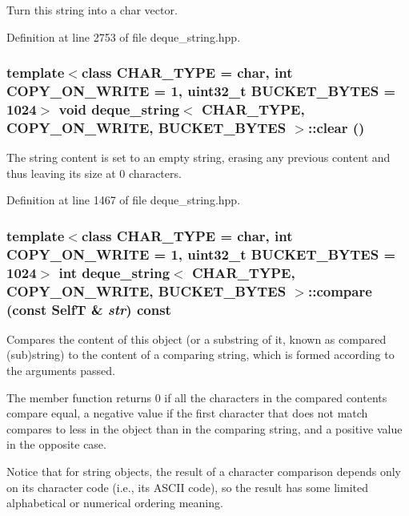 Turn this string into a char vector. 

Definition at line 2753 of file deque\_\-string.hpp.\hypertarget{classdeque__string_4ee86cce5b0bdf35309bcdf0e1cee4e5}{
\subsubsection[{clear}]{\setlength{\rightskip}{0pt plus 5cm}template$<$class CHAR\_\-TYPE  = char, int COPY\_\-ON\_\-WRITE = 1, uint32\_\-t BUCKET\_\-BYTES = 1024$>$ void {\bf deque\_\-string}$<$ CHAR\_\-TYPE, COPY\_\-ON\_\-WRITE, BUCKET\_\-BYTES $>$::clear ()}}
\label{classdeque__string_4ee86cce5b0bdf35309bcdf0e1cee4e5}


The string content is set to an empty string, erasing any previous content and thus leaving its size at 0 characters. 

Definition at line 1467 of file deque\_\-string.hpp.\hypertarget{classdeque__string_703af7d90146d6f0589d5a778e488ebf}{
\subsubsection[{compare}]{\setlength{\rightskip}{0pt plus 5cm}template$<$class CHAR\_\-TYPE  = char, int COPY\_\-ON\_\-WRITE = 1, uint32\_\-t BUCKET\_\-BYTES = 1024$>$ int {\bf deque\_\-string}$<$ CHAR\_\-TYPE, COPY\_\-ON\_\-WRITE, BUCKET\_\-BYTES $>$::compare (const {\bf SelfT} \& {\em str}) const}}
\label{classdeque__string_703af7d90146d6f0589d5a778e488ebf}


Compares the content of this object (or a substring of it, known as compared (sub)string) to the content of a comparing string, which is formed according to the arguments passed.

The member function returns 0 if all the characters in the compared contents compare equal, a negative value if the first character that does not match compares to less in the object than in the comparing string, and a positive value in the opposite case.

Notice that for string objects, the result of a character comparison depends only on its character code (i.e., its ASCII code), so the result has some limited alphabetical or numerical ordering meaning.

